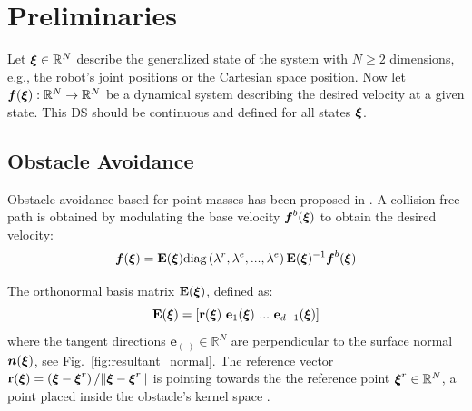 \section{Preliminaries}
Let $\boldsymbol{\xi} \in \mathbb{R}^N$ describe the generalized state of the system with $N \geq 2$ dimensions, e.g., the robot's joint positions or the Cartesian space position.
Now let $\boldsymbol{f}(\boldsymbol{\xi}): \mathbb{R}^N \rightarrow \mathbb{R}^N$ be a dynamical system describing the desired velocity at a given state. This DS should be continuous and defined for all states $\boldsymbol{\xi}$. 

\subsection{Obstacle Avoidance}
Obstacle avoidance based for point masses has been proposed in \cite{huber2022avoiding}. A collision-free path is obtained by modulating the base velocity $\boldsymbol{f}^b(\boldsymbol{\xi})$ to obtain the desired velocity:
\begin{equation}
  \vecs f(\vecs \xi) = \textbf{E}(\vecs \xi) \text{diag} \left(\lambda^r, \lambda^e, ..., \lambda^e \right) \textbf{E}(\vecs{\xi})^{-1} \vect f^b(\vecs \xi)
  \label{eq:modulated} 
\end{equation}

The orthonormal basis matrix $\textbf{E}(\boldsymbol{\xi})$, defined as:
\begin{equation}
\textbf{E}(\vecs \xi) = \left[ \textbf{r}(\vecs \xi) \ \textbf{e}_1(\vecs \xi) \ ... \ \textbf{e}_{d-1}(\vecs \xi) \right]
\label{eq:matrix_E}
\end{equation}
where the tangent directions $\textbf{e}_{(\cdot)} \in \mathbb{R}^N$ are perpendicular to the surface normal $\boldsymbol{n}(\boldsymbol{\xi})$, see Fig.~\ref{fig:resultant_normal}. The reference vector $\textbf{r}(\boldsymbol{\xi}) =  \left( \boldsymbol{\xi}-\boldsymbol{\xi}^r \right) / \| \boldsymbol{\xi}-\boldsymbol{\xi} ^r \|$ is pointing towards the the reference point $\boldsymbol{\xi}^r \in \mathbb{R}^N$, a point placed inside the obstacle's kernel space \cite{huber2023avoidance}.


